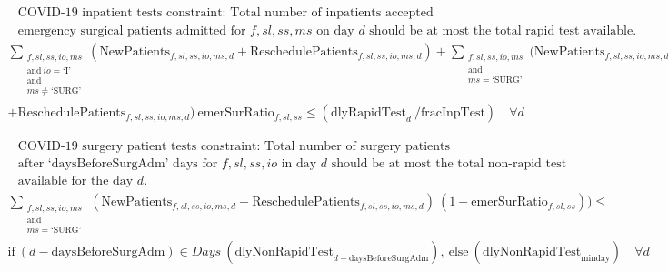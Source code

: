 \documentclass[10pt, letterpaper]{article}
\begin{document}
\pagebreak

\begin{align*}
&\text{COVID-19 inpatient tests constraint: Total number of inpatients accepted (excluding surgical patients) and the } \\
&\text{emergency surgical patients admitted for $f,sl,ss,ms$ on day $d$ should be at most the total rapid test available.}
\end{align*}
\begin{equation} 
\begin{multlined}
\sum_{\substack{f,sl,ss,io,ms \\ 
\text{and} \ io = \text{`I'} \\
\text{and} \\ ms \not= \text{`SURG'}}} (\text{NewPatients}_{f,sl,ss,io,ms,d}  + \text{ReschedulePatients}_{f,sl,ss,io,ms,d})  + 
\sum_{\substack{f,sl,ss,io,ms \\  
\text{and} \\ ms = \text{`SURG'}}} (\text{NewPatients}_{f,sl,ss,io,ms,d} \\ + \text{ReschedulePatients}_{f,sl,ss,io,ms,d}) \ \text{emerSurRatio}_{f,sl,ss} \leq (\text{dlyRapidTest}_{d} \ / \text{fracInpTest}) \quad \forall d\
\end{multlined}
\end{equation}

\begin{align*}
&\text{COVID-19 surgery patient tests constraint: Total number of surgery patients who will be admitted for surgery } \\
&\text{after `daysBeforeSurgAdm' days for $f,sl,ss,io$ in day $d$ should be at most the total non-rapid test} \\
&\text{available for the day $d$.} 
\end{align*}
\begin{equation} 
\begin{multlined}
\sum_{\substack{f,sl,ss,io,ms \ \\
\text{and} \\ ms = \text{`SURG'}}} (\text{NewPatients}_{f,sl,ss,io,ms,d} + \text{ReschedulePatients}_{f,sl,ss,io,ms,d}) \ (1- \text{emerSurRatio}_{f,sl,ss}))  \leq \\
\text{if} \ (d-\text{daysBeforeSurgAdm}) \in Days \ (\text{dlyNonRapidTest}_{d-\text{daysBeforeSurgAdm}}), \ \text{else} \ (\text{dlyNonRapidTest}_{\text{minday}})
 \quad \forall d\
\end{multlined}
\end{equation}
\end{document}
